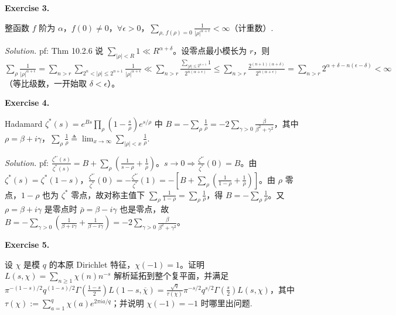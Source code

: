 \documentclass[
	colors = true,
	geometry = b5,
	fontsetup = font-setup-overleaf.tex,
	titlesetup = titles-setup.tex
]{AJbook}
\newenvironment{sheetexercise}[1]{%
	\par\medskip
	\noindent\textbf{Exercise #1.}\enspace
}{%
	\par\smallskip
}
\newenvironment{solution}{%
	\par\smallskip
	\noindent\textit{Solution.}\enspace
}{%
	\par\smallskip
}
\begin{document}
\begin{sheetexercise}{3}
整函数 $f$ 阶为 $\alpha$，$f(0)\ne0$，$\forall\epsilon>0$，$\sum_{\rho,\,f(\rho)=0}\frac1{|\rho|^{\alpha+\epsilon}}<\infty$（计重数）.
\end{sheetexercise}
\begin{solution}pf: Thm 10.2.6 说 $\sum_{|\rho|<R}1\ll R^{\alpha+\delta}$。设零点最小模长为 $r$，则 $\sum_{\rho}\frac1{|\rho|^{\alpha+\epsilon}}=\sum_{n>r}\sum_{2^n<|\rho|\leq2^{n+1}}\frac1{|\rho|^{\alpha+\epsilon}}\ll\sum_{n>r}\frac{\sum_{|\rho|\leq2^{n+1}}1}{2^{n(\alpha+\epsilon)}}\leq\sum_{n>r}\frac{2^{(n+1)(\alpha+\delta)}}{2^{n(\alpha+\epsilon)}}=\sum_{n>r}2^{\alpha+\delta-n(\epsilon-\delta)}<\infty$（等比级数，一开始取 $\delta<\epsilon$）。\end{solution}
\begin{sheetexercise}{4}
Hadamard $\zeta^*(s)=e^{Bs}\prod_\rho(1-\frac{s}{\rho})e^{s/\rho}$ 中 $B=-\sum_\rho\frac1\rho=-2\sum_{\gamma>0}\frac{\beta}{\beta^2+\gamma^2}$，其中 $\rho=\beta+i\gamma$，$\sum_\rho\frac1\rho\triangleq\lim_{x\to\infty}\sum_{|\rho|<x}\frac1\rho$.
\end{sheetexercise}
\begin{solution}pf: $\frac{\zeta^{*'}(s)}{\zeta^*(s)}=B+\sum_\rho(\frac1{s-\rho}+\frac1\rho)$。$s\to0\Rightarrow\frac{\zeta^{*'}}{\zeta^*}(0)=B$。由 $\zeta^*(s)=\zeta^*(1-s)$，$\frac{\zeta^{*'}}{\zeta^*}(0)=-\frac{\zeta^{*'}}{\zeta^*}(1)=-[B+\sum_\rho(\frac1{1-\rho}+\frac1\rho)]$。由 $\rho$ 零点，$1-\rho$ 也为 $\zeta^*$ 零点，故对称主值下 $\sum_\rho\frac1{1-\rho}=\sum_\rho\frac1\rho$，得 $B=-\sum_\rho\frac1\rho$。又 $\rho=\beta+i\gamma$ 是零点时 $\bar\rho=\beta-i\gamma$ 也是零点，故 $B=-\sum_{\gamma>0}(\frac1{\beta+i\gamma}+\frac1{\beta-i\gamma})=-2\sum_{\gamma>0}\frac{\beta}{\beta^2+\gamma^2}$。\end{solution}
\begin{sheetexercise}{5}
设 $\chi$ 是模 $q$ 的本原 Dirichlet 特征，$\chi(-1)=1$。证明 $L(s,\chi)=\sum_{n\geq1}\chi(n)n^{-s}$ 解析延拓到整个复平面，并满足 $\pi^{-(1-s)/2}q^{(1-s)/2}\Gamma(\frac{1-s}{2})L(1-s,\overline\chi)=\frac{\sqrt q}{\tau(\chi)}\pi^{-s/2}q^{s/2}\Gamma(\frac s2)L(s,\chi)$，其中 $\tau(\chi):=\sum_{a=1}^q\chi(a)e^{2\pi ia/q}$；并说明 $\chi(-1)=-1$ 时哪里出问题.
\end{sheetexercise}
\end{document}
